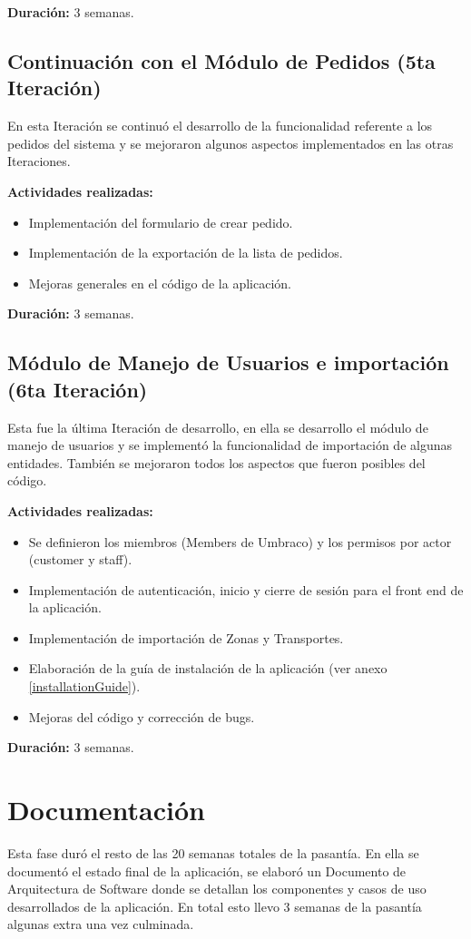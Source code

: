 \textbf{Duración:} 3 semanas.

\subsection{Continuación con el Módulo de Pedidos (5ta Iteración)}
En esta Iteración se continuó el desarrollo de la funcionalidad referente a los pedidos del sistema y se mejoraron algunos aspectos implementados en las otras Iteraciones.

\textbf{Actividades realizadas:}
\begin{itemize}
    \item Implementación del formulario de crear pedido.
    \item Implementación de la exportación de la lista de pedidos.
    \item Mejoras generales en el código de la aplicación.
\end{itemize}

\textbf{Duración:} 3 semanas.

\subsection{Módulo de Manejo de Usuarios e importación (6ta Iteración)}
Esta fue la última Iteración de desarrollo, en ella se desarrollo el módulo de manejo de usuarios y se implementó la funcionalidad de importación de algunas entidades. También se mejoraron todos los aspectos que fueron posibles del código.

\textbf{Actividades realizadas:}
\begin{itemize}
    \item Se definieron los miembros (Members de Umbraco) y los permisos por actor (customer y staff).
    \item Implementación de autenticación, inicio y cierre de sesión para el front end de la aplicación.
    \item Implementación de importación de Zonas y Transportes.
    \item Elaboración de la guía de instalación de la aplicación (ver anexo \ref{installationGuide}).
    \item Mejoras del código y corrección de bugs.
\end{itemize}

\textbf{Duración:} 3 semanas.

\section{Documentación}
Esta fase duró el resto de las 20 semanas totales de la pasantía. En ella se documentó el estado final de la aplicación, se elaboró un Documento de Arquitectura de Software donde se detallan los componentes y casos de uso desarrollados de la aplicación. En total esto llevo 3 semanas de la pasantía algunas extra una vez culminada.